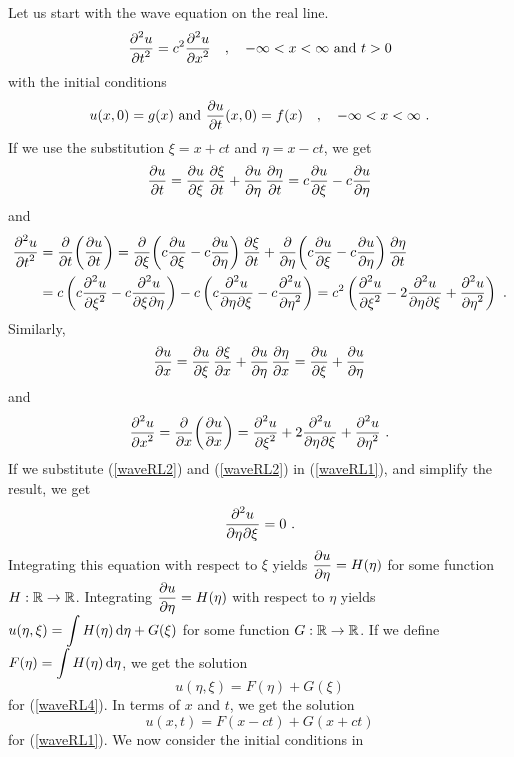 Let us start with the wave equation on the real line.
\begin{equation}\label{waveRL1}
  \pdydxn{u}{t}{2} = c^2 \pdydxn{u}{x}{2} \quad , \quad
  -\infty < x < \infty \ \text{and} \ t > 0
\end{equation}
with the initial conditions
\begin{equation} \label{waveRL5}
u(x,0) = g(x) \ \text{and} \ \pdydx{u}{t}(x,0) = f(x) \quad , \quad
 -\infty < x < \infty \ .
\end{equation}
If we use the substitution $\xi = x+ ct$ and $\eta = x- ct$, we get
\[
  \pdydx{u}{t} = \pdydx{u}{\xi}\,\pdydx{\xi}{t} +
  \pdydx{u}{\eta}\, \pdydx{\eta}{t} = c \pdydx{u}{\xi} - c \pdydx{u}{\eta}
\]
and
\begin{align}
\pdydxn{u}{t}{2} &= \pdfdx{\left(\pdydx{u}{t}\right)}{t}
= \pdfdx{\left(c \pdydx{u}{\xi} - c \pdydx{u}{\eta}\right)}{\xi}
\,\pdydx{\xi}{t} +
\pdfdx{\left(c \pdydx{u}{\xi} - c \pdydx{u}{\eta}\right)}{\eta}
\,\pdydx{\eta}{t} \nonumber \\
&  = c \left(c \pdydxn{u}{\xi}{2} - c \pdydxnm{u}{\xi}{\eta}{2}{}{}\right)
- c \left(c \pdydxnm{u}{\eta}{\xi}{2}{}{} - c \pdydxn{u}{\eta}{2}\right)
= c^2 \left( \pdydxn{u}{\xi}{2} - 2 \pdydxnm{u}{\eta}{\xi}{2}{}{}
+ \pdydxn{u}{\eta}{2}\right) \ .  \label{waveRL2}
\end{align}
Similarly,
\[
  \pdydx{u}{x} = \pdydx{u}{\xi}\,\pdydx{\xi}{x} +
  \pdydx{u}{\eta}\, \pdydx{\eta}{x} = \pdydx{u}{\xi} + \pdydx{u}{\eta}
\]
and
\begin{equation} \label{waveRL3}
  \pdydxn{u}{x}{2} = \pdfdx{\left(\pdydx{u}{x}\right)}{x}
  = \pdydxn{u}{\xi}{2} + 2 \pdydxnm{u}{\eta}{\xi}{2}{}{}
+ \pdydxn{u}{\eta}{2} \ .
\end{equation}
If we substitute (\ref{waveRL2}) and (\ref{waveRL2}) in
(\ref{waveRL1}), and simplify the result, we get
\begin{equation} \label{waveRL4}
  \pdydxnm{u}{\eta}{\xi}{2}{}{} = 0 \ .
\end{equation}
Integrating this equation with respect to $\xi$ yields
$\DS \pdydx{u}{\eta} = H(\eta)$ for
some function $H:\RR\rightarrow \RR$.  Integrating
$\DS \pdydx{u}{\eta} = H(\eta)$ with
respect to $\eta$ yields
$\DS u(\eta,\xi) = \int H(\eta) \dx{\eta} + G(\xi)$ for some
function $G:\RR\rightarrow \RR$.  If we define
$\DS F(\eta) = \int H(\eta) \dx{\eta}$, we get the solution
\[
u(\eta,\xi) = F(\eta) + G(\xi)
\]
for (\ref{waveRL4}).  In terms of $x$ and $t$, we get the solution
\[
u(x,t) = F(x-ct) + G(x+ct)
\]
for (\ref{waveRL1}).  We now consider the initial conditions in
